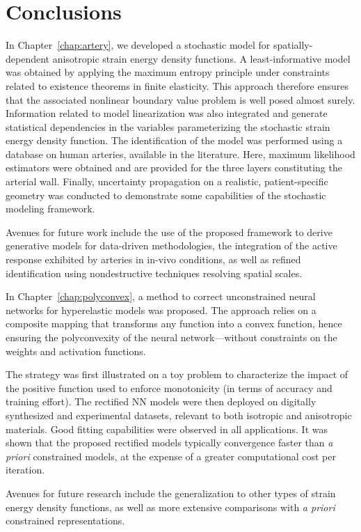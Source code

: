 \chapter{Conclusions}
\label{chap:conclusion}

In Chapter~\ref{chap:artery}, we developed a stochastic model for spatially-dependent anisotropic strain energy density functions. A least-informative model was obtained by applying the maximum entropy principle under constraints related to existence theorems in finite elasticity. This approach therefore ensures that the associated nonlinear boundary value problem is well posed almost surely. Information related to model linearization was also integrated and generate statistical dependencies in the variables parameterizing the stochastic strain energy density function. The identification of the model was performed using a database on human arteries, available in the literature. Here, maximum likelihood estimators were obtained and are provided for the three layers constituting the arterial wall. Finally, uncertainty propagation on a realistic, patient-specific geometry was conducted to demonstrate some capabilities of the stochastic modeling framework.

Avenues for future work include the use of the proposed framework to derive generative models for data-driven methodologies, the integration of the active response exhibited by arteries in in-vivo conditions, as well as refined identification using nondestructive techniques resolving spatial scales.

In Chapter~\ref{chap:polyconvex}, a method to correct unconstrained neural networks for hyperelastic models was proposed. The approach relies on a composite mapping that transforms any function into a convex function, hence ensuring the polyconvexity of the neural network---without constraints on the weights and  activation functions. 

The strategy was first illustrated on a toy problem to characterize the impact of the positive function used to enforce monotonicity (in terms of accuracy and training effort). The rectified NN models were then deployed on digitally synthesized and experimental datasets, relevant to both isotropic and anisotropic materials. Good fitting capabilities were observed in all applications. It was shown that the proposed rectified models typically convergence faster than \textit{a priori} constrained models, at the expense of a greater computational cost per iteration. 

Avenues for future research include the generalization to other types of strain energy density functions, as well as more extensive comparisons with \textit{a priori} constrained representations. 

